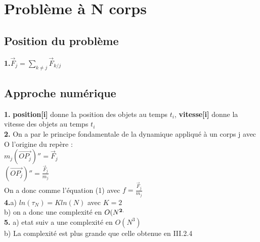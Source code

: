 \documentclass{article}
\begin{document}
\section{Problème à N corps}
\subsection{Position du problème}
{\bf 1.}$\vec F_j= \sum_{k \neq j} \vec F_{k/j}$

\subsection{Approche numérique}
{\bf 1.} {\bf position[i]} donne la position des objets au temps $t_i$, {\bf vitesse[i]} donne la vitesse des objets au temps $t_i$ \\
{\bf 2.} On a par le principe fondamentale de la dynamique appliqué à un corps j avec O l'origine du repère : \\
$ m_j (\overrightarrow{OP_j})'' = \vec F_j $ \\
$(\overrightarrow{OP_j})'' =\frac{ \vec F_j}{m_j} $ \\
On a donc comme l'équation (1) avec $f=\frac{ \vec F_j}{m_j}$ \\

{\bf 4.}a) $ln(\tau_N)=Kln(N)$ avec $K=2$ \\
b) on a donc une complexité en $O(N^{\bf 2.}$ \\
{\bf 5.} a) etat suiv a une complexité en $O(N^3)$ \\
b) La complexité est plus grande que celle obtenue en III.2.4 \\

\end{document}

